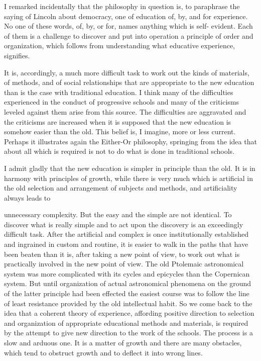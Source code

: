 I remarked incidentally that the philosophy in question is, to paraphrase the saying of 
Lincoln about democracy, one of education of, by, and for experience. No one of these 
words, of, by, or for, names anything which is self- evident. Each of them is a challenge 
to discover and put into operation a principle of order and organization, which follows 
from understanding what educative experience, signifies. 

It is, accordingly, a much more difficult task to work out the kinds of materials, of 
methods, and of social relationships that are appropriate to the new education than is the 
case with traditional education. I think many of the difficulties experienced in the conduct 
of progressive schools and many of the criticisms leveled against them arise from this 
source. The difficulties are aggravated and the criticisms are increased when it is 
supposed that the new education is somehow easier than the old. This belief is, I imagine, 
more or less current. Perhaps it illustrates again the Either-Or philosophy, springing from 
the idea that about all which is required is not to do what is done in traditional schools. 

I admit gladly that the new education is simpler in principle than the old. It is in 
harmony with principles of growth, while there is very much which is artificial in the old 
selection and arrangement of subjects and methods, and artificiality always leads to 



unnecessary complexity. But the easy and the simple are not identical. To discover what 
is really simple and to act upon the discovery is an exceedingly difficult task. After the 
artificial and complex is once institutionally established and ingrained in custom and 
routine, it is easier to walk in the paths that have been beaten than it is, after taking a new 
point of view, to work out what is practically involved in the new point of view. The old 
Ptolemaic astronomical system was more complicated with its cycles and epicycles than 
the Copernican system. But until organization of actual astronomical phenomena on the 
ground of the latter principle had been effected the easiest course was to follow the line 
of least resistance provided by the old intellectual habit. So we come back to the idea that 
a coherent theory of experience, affording positive direction to selection and organization 
of appropriate educational methods and materials, is required by the attempt to give new 
direction to the work of the schools. The process is a slow and arduous one. It is a matter 
of growth and there are many obstacles, which tend to obstruct growth and to deflect it 
into wrong lines. 

